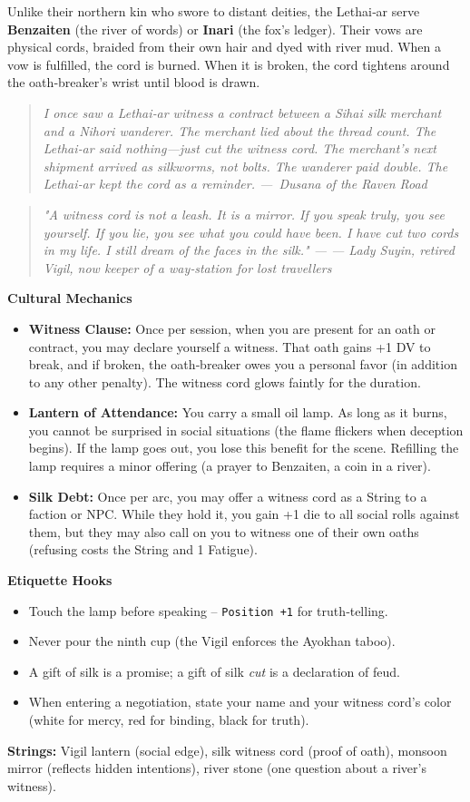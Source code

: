 \documentclass[12pt]{book}
\newcommand{\dusana}[1]{%
    \begin{quote}\itshape #1 ---~Dusana of the Raven Road\end{quote}}
\newcommand{\letter}[2]{%
    \begin{quote}\small\itshape #1 \hfill --- #2\end{quote}}
\begin{document}
Unlike their northern kin who swore to distant deities, the Lethai‑ar serve \textbf{Benzaiten} (the river of words) or \textbf{Inari} (the fox's ledger). Their vows are physical cords, braided from their own hair and dyed with river mud. When a vow is fulfilled, the cord is burned. When it is broken, the cord tightens around the oath‑breaker's wrist until blood is drawn.

\vspace{0.5em}
\dusana{I once saw a Lethai‑ar witness a contract between a Sihai silk merchant and a Nihori wanderer. The merchant lied about the thread count. The Lethai‑ar said nothing---just cut the witness cord. The merchant's next shipment arrived as silkworms, not bolts. The wanderer paid double. The Lethai‑ar kept the cord as a reminder.}

\letter{"A witness cord is not a leash. It is a mirror. If you speak truly, you see yourself. If you lie, you see what you could have been. I have cut two cords in my life. I still dream of the faces in the silk."}{--- Lady Suyin, retired Vigil, now keeper of a way‑station for lost travellers}

\begin{infobox}
\textbf{Cultural Mechanics}
\begin{itemize}
    \item \textbf{Witness Clause:} Once per session, when you are present for an oath or contract, you may declare yourself a witness. That oath gains +1 DV to break, and if broken, the oath‑breaker owes you a personal favor (in addition to any other penalty). The witness cord glows faintly for the duration.
    \item \textbf{Lantern of Attendance:} You carry a small oil lamp. As long as it burns, you cannot be surprised in social situations (the flame flickers when deception begins). If the lamp goes out, you lose this benefit for the scene. Refilling the lamp requires a minor offering (a prayer to Benzaiten, a coin in a river).
    \item \textbf{Silk Debt:} Once per arc, you may offer a witness cord as a String to a faction or NPC. While they hold it, you gain +1 die to all social rolls against them, but they may also call on you to witness one of their own oaths (refusing costs the String and 1 Fatigue).
\end{itemize}
\textbf{Etiquette Hooks}
\begin{itemize}
    \item Touch the lamp before speaking -- \texttt{Position +1} for truth‑telling.
    \item Never pour the ninth cup (the Vigil enforces the Ayokhan taboo).
    \item A gift of silk is a promise; a gift of silk \textit{cut} is a declaration of feud.
    \item When entering a negotiation, state your name and your witness cord's color (white for mercy, red for binding, black for truth).
\end{itemize}
\textbf{Strings:} Vigil lantern (social edge), silk witness cord (proof of oath), monsoon mirror (reflects hidden intentions), river stone (one question about a river's witness).
\end{infobox}
\end{document}
